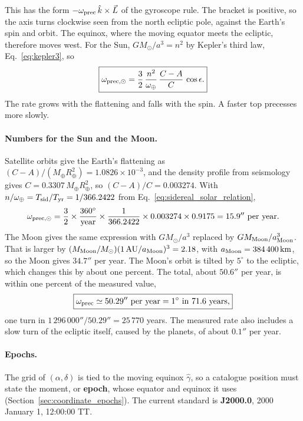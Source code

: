 This has the form $-\omega_{\rm prec}\,\hat k\times\vec L$ of the gyroscope rule. The bracket is positive, so the axis turns clockwise seen from the north ecliptic pole, against the Earth's spin and orbit. The equinox, where the moving equator meets the ecliptic, therefore moves west. For the Sun, $GM_\odot/a^3=n^2$ by Kepler's third law, Eq.~\eqref{eq:kepler3}, so
\begin{equation}
	\boxed{\omega_{\rm prec,\odot}=\frac32\,\frac{n^2}{\omega_\oplus}\,\frac{C-A}{C}\,\cos\epsilon.}
	\label{ti:eq:prec_sun}
\end{equation}
The rate grows with the flattening and falls with the spin. A faster top precesses more slowly.

\paragraph{Numbers for the Sun and the Moon.} Satellite orbits give the Earth's flattening as $(C-A)/(M_\oplus R_\oplus^2)=1.0826\times10^{-3}$, and the density profile from seismology gives $C=0.3307\,M_\oplus R_\oplus^2$, so $(C-A)/C=0.003274$. With $n/\omega_\oplus=T_{\rm sid}/T_{\rm yr}=1/366.2422$ from Eq.~\eqref{eq:sidereal_solar_relation},
\[
\omega_{\rm prec,\odot}=\frac32\times\frac{360^\circ}{\text{year}}\times\frac{1}{366.2422}\times0.003274\times0.9175=15.9''\ \text{per year}.
\]
The Moon gives the same expression with $GM_\odot/a^3$ replaced by $GM_{\rm Moon}/a_{\rm Moon}^3$. That is larger by $(M_{\rm Moon}/M_\odot)(1\,\mathrm{AU}/a_{\rm Moon})^3=2.18$, with $a_{\rm Moon}=384\,400\,\mathrm{km}$, so the Moon gives $34.7''$ per year. The Moon's orbit is tilted by $5^\circ$ to the ecliptic, which changes this by about one percent. The total, about $50.6''$ per year, is within one percent of the measured value,
\begin{equation}
	\boxed{\omega_{\rm prec} \simeq 50.29''\ \text{per year} = 1^\circ\ \text{in}\ 71.6\ \text{years},}
	\label{eq:precession_rate}
\end{equation}
one turn in $1\,296\,000''/50.29''=25\,770$ years. The measured rate also includes a slow turn of the ecliptic itself, caused by the planets, of about $0.1''$ per year.

\paragraph{Epochs.} The grid of $(\alpha,\delta)$ is tied to the moving equinox $\hat\gamma$, so a catalogue position must state the moment, or \textbf{epoch}, whose equator and equinox it uses (Section~\ref{sec:coordinate_epochs}). The current standard is \textbf{J2000.0}, 2000 January 1, 12:00:00 TT.

